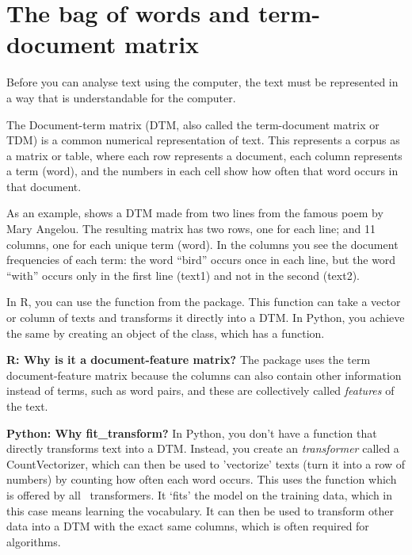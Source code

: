 \section{The bag of words and term-document matrix}
\label{sec:dtm}

Before you can analyse text using the computer, the text must be represented in a way that is understandable for the computer.

The Document-term matrix (DTM, also called the term-document matrix or TDM) is a common numerical representation of text.
This represents a corpus as a matrix or table, where each row represents a document, each column represents a term (word),
and the numbers in each cell show how often that word occurs in that document.


As an example,  shows a DTM made from two lines from the famous poem by Mary Angelou.
The resulting matrix has two rows, one for each line; and 11 columns, one for each unique term (word).
In the columns you see the document frequencies of each term: the word ``bird'' occurs once in each line,
but the word ``with'' occurs only in the first line (text1) and not in the second (text2).

In R, you can use the  function from the  package.
This function can take a vector or column of texts and transforms it directly into a DTM.
In Python, you achieve the same by creating an object of the  class, which has a  function.

\begin{feature}
  \textbf{R: Why is it a document-feature matrix?}
The package  uses the term document-feature matrix because the columns can also contain
other information instead of terms, such as word pairs, and these are collectively called \emph{features} of the text.

\noindent\textbf{Python: Why fit\_transform?}
In Python, you don't have a function that directly transforms text into a DTM.
Instead, you create an \emph{transformer} called a CountVectorizer,
which can then be used to 'vectorize' texts (turn it into a row of numbers)
by counting how often each word occurs.
This uses the  function which is offered by all \sklearn\ transformers.
It `fits' the model on the training data, which in this case means learning the vocabulary.
It can then be used to transform other data into a DTM with the exact same columns,
which is often required for algorithms. 
\end{feature}

